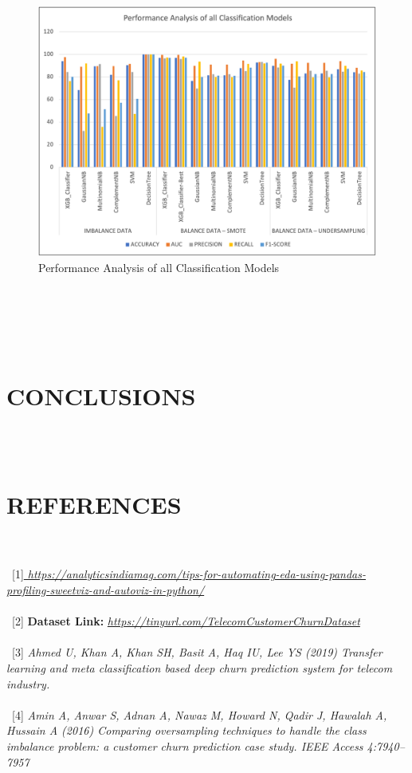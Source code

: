 \documentclass[a4paper, 10pt, conference]{ieeeconf}      %
\begin{document}
\\\
\begin{figure}[htp]
    \centering
    \includegraphics[scale= .5]{Images/performanceAnalysis.png}
    \caption{Performance Analysis of all Classification Models}
    \label{fig:PerformanceAnalysis}
\end{figure}
\\\
\\\
\\\
\section{\textbf{CONCLUSIONS}}
\\\
\section{\textbf{REFERENCES}}

\\\
\color{teal}
\\\
[1]\textit{\url{ https://analyticsindiamag.com/tips-for-automating-eda-using-pandas-profiling-sweetviz-and-autoviz-in-python/}}
\\\
\\\
[2] \textbf{ Dataset Link:}  \textit{ \url{https://tinyurl.com/TelecomCustomerChurnDataset}}
\\\
\\\
[3]  \textit{Ahmed U, Khan A, Khan SH, Basit A, Haq IU, Lee YS (2019) Transfer learning and meta classification based deep churn prediction system for telecom industry.}
\\\
\\\
[4] \textit{Amin A, Anwar S, Adnan A, Nawaz M, Howard N, Qadir J, Hawalah A, Hussain A (2016) Comparing oversampling techniques to handle the class imbalance problem: a customer churn prediction case study. IEEE Access 4:7940–7957}
\end{document}
